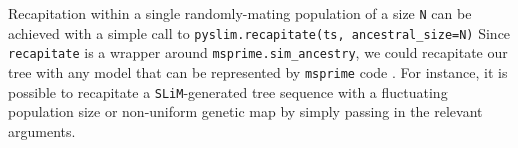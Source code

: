 \documentclass[12pt]{article}
\newcommand{\msprime}[0]{\texttt{msprime}\xspace}
\newcommand{\slim}[0]{\texttt{SLiM}\xspace}
\newcommand*{\ie}{i.e.\xcomma}
\begin{document}

Recapitation within a single randomly-mating population of a size \verb|N|
can be achieved with a simple call to \verb|pyslim.recapitate(ts, ancestral_size=N)|
Since \verb|recapitate| is a wrapper around
\verb|msprime.sim_ancestry|, we could recapitate our tree with any model that can be represented by \msprime code \citep{baumdicker_efficient_2022}.
For instance, it is possible to recapitate a \slim-generated tree sequence with a fluctuating population size
or non-uniform genetic map by simply passing in the relevant arguments.
\end{document}
